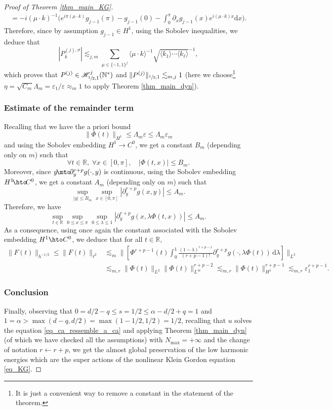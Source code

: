 \begin{proof}[Proof of Theorem \ref{thm_main_KG}]
\begin{multline*}
=-i (\mu \cdot k)^{-1} \biggl(e^{i\pi(\mu \cdot k) } g_{j-1}(\pi) - g_{j-1}(0) - \int_0^\pi \partial_x g_{j-1}(x) e^{i(\mu \cdot k) x} \mathrm{d}x \biggr).
\end{multline*}
Therefore, since by assumption $g_{j-1} \in H^1$, using the Sobolev inequalities, we deduce that
\[
|P^{(j),\sigma}_k| \lesssim_{j,m} \sum_{\mu \in \{-1,1\}^j} \langle \mu \cdot k \rangle^{-1} \sqrt{ \langle k_1 \rangle \cdots \langle k_\ell \rangle }^{-1},
\]
which proves that $P^{(j)} \in \mathscr{H}_{\sfrac12,1}^j(\mathbb{N}^*)$ and $\| P^{(j)} \|_{\sfrac12,1} \lesssim_{m,j} 1$ (here we choose\footnote{It is just a convenient way to remove a constant in the statement of the theorem.} $\eta = \sqrt{C_m} \Lambda_m= \varepsilon_1/\varepsilon\approx_m 1$ to apply Theorem \ref{thm_main_dyn}).

\subsubsection*{Estimate of the remainder term}
Recalling that we have the a priori bound
\[
\| \Phi(t) \|_{H^1} \leq \Lambda_m \varepsilon \leq \Lambda_m \varepsilon_m
\]
and using the Sobolev embedding $H^1 \to C^0$, we get a constant $B_m$ (depending only on $m$) such that
\[
\forall t\in \mathbb{R},\; \forall x\in [0,\pi], \quad | \Phi(t,x) | \leq B_m.
\]
Moreover, since $y\!\mto\! \partial_{y}^{r+p} g(\cdot,y)$ is continuous, using the Sobolev embedding \hbox{$H^1\!\hto\!C^0$}, we get a constant $A_m$ (depending only on $m$) such that
\[
\sup_{|y|\leq B_m} \sup_{x\in [0,\pi]} | \partial_{y}^{r+p} g(x,y)| \leq A_m.
\]
Therefore, we have
\[
\sup_{t\in \mathbb{R}} \sup_{0 \leq x \leq \pi} \sup_{0 \leq \lambda \leq 1} |\partial_{y}^{r+p} g(x,\lambda \Phi(t,x))| \leq A_m.
\]
As a consequence, using once again the constant associated with the Sobolev embedding $H^1 \hto C^0$, we deduce that for all $t\in \mathbb{R}$,
\begin{align*}
\| F(t) \|_{h^{-1/2}} \leq \| F(t) \|_{\ell^2} &\lesssim_m \biggl\| \left[\Phi^{r+p-1}(t) \int_0^1 \frac{(1-\lambda)^{r+p-1}}{(r+p-1)!} \partial_{y}^{r+p} g(\cdot,\lambda \Phi(t)) \, \mathrm{d}\lambda \right] \biggr\|_{L^2} \\
&\lesssim_{m,r} \| \Phi(t) \|_{L^2} \| \Phi(t) \|_{L^\infty}^{r+p-2} \lesssim_{m,r} \| \Phi(t) \|_{H^1}^{r+p-1} \lesssim_{m,r} \varepsilon_1^{r+p-1}.
\end{align*}

\subsubsection*{Conclusion}
Finally, observing that $0=d/2-q \leq s=1/2 \leq \alpha - d/2 +q =1 $ and $1=\alpha > \max(d-q,d/2) =\max(1-1/2,1/2)=1/2$, recalling that $u$ solves the equation \eqref{eq_ca_ressemble_a_ca} and applying Theorem \ref{thm_main_dyn} (of which we have checked all the assumptions) with $N_{\max}=+\infty$ and the change of notation $r\leftarrow r+p$, we get the almost global preservation of the low harmonic energies which are the super actions of the nonlinear Klein Gordon equation \eqref{eq_KG}.
\end{proof}

